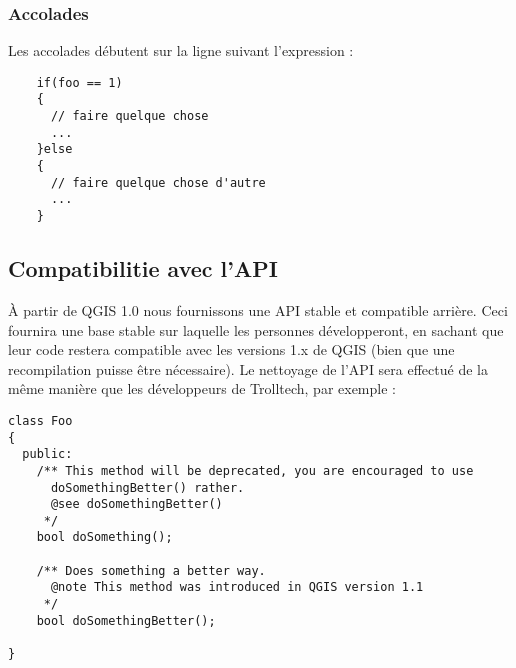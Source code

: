 \subsubsection{Accolades}
Les accolades débutent sur la ligne suivant l'expression :

\begin{verbatim}
	if(foo == 1)
	{
	  // faire quelque chose
	  ...
 	}else
	{
	  // faire quelque chose d'autre
	  ...
	}
\end{verbatim}

\subsection{Compatibilitie avec l'API}
À partir de QGIS 1.0 nous fournissons une API stable et compatible arrière. Ceci fournira une base stable sur laquelle les personnes développeront, en sachant que leur code restera compatible avec les versions 1.x de QGIS (bien que une recompilation puisse être nécessaire). Le nettoyage de l'API sera effectué de la même manière que les développeurs de Trolltech, par exemple :

\begin{verbatim}
class Foo 
{
  public:
    /** This method will be deprecated, you are encouraged to use 
      doSomethingBetter() rather.
      @see doSomethingBetter()
     */
    bool doSomething();

    /** Does something a better way.
      @note This method was introduced in QGIS version 1.1
     */
    bool doSomethingBetter();

}
\end{verbatim}

